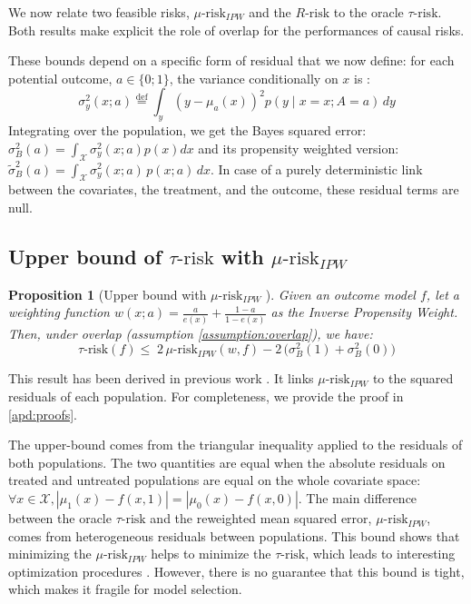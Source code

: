 \documentclass[french,12pt,twoside,a4paper]{book}
\newtheorem{proposition}{Proposition}
\begin{document}
We now relate two feasible risks, $\mu \text{-risk}_{IPW}$ and the
$R\text{-risk}$ to the oracle $\tau\text{-risk}$. Both results make
explicit the role of overlap for the performances of causal risks.

These bounds depend on a specific form of residual that we now define: for each potential outcome, $a \in  \{0; 1\}$, the variance conditionally on $x$
is \citep{shalit_estimating_2017}:
\begin{equation*}\label{eq:residuals}
  \sigma_{y}^{2}(x ; a) \overset{\text{def}}{=}
  \int_{y}\left(y-\mu_{a}(x)\right)^{2} p(y \mid x=x ; A=a) \, d y
\end{equation*}
Integrating over the population, we get the Bayes squared error:
$\sigma^2_{B}(a) = \int_{\mathcal X} \sigma_y^2(x;a) p(x)dx$
and its propensity weighted version:
$\tilde{\sigma}^2_{B}(a) = \int_{\mathcal X}\sigma_y^2(x;a)\,  p(x;
  a)\,dx$. In case of a purely deterministic link between the
covariates, the treatment, and the outcome, these residual terms are null.


\subsection{Upper bound of $\tau\text{-risk}$ with $\mu\text{-risk}_{IPW}$}%
\label{theory:mu_risk_ipw_bound}%

\begin{proposition}[Upper bound with $\mu \text{-risk}_{IPW}$
  ]\label{theory:prop:mu_risk_ipw_bound}
  \citep{johansson2022generalization} Given an outcome model $f$, let a
  weighting function $w(x; a) = \frac{a}{e(x)} + \frac{1-a}{1-e(x)}$ as the
  Inverse Propensity Weight. Then, under overlap (assumption
  \ref{assumption:overlap}), we have:
  \begin{equation*}
    \tau\text{-risk}(f) \leq \; 2 \, \mu\text{-risk}_{IPW}(w, f)
    - 2 \, \big(\sigma^2_{B}(1) +  \sigma^2_{B}(0)\big)
  \end{equation*}
\end{proposition}
This result has been derived in previous work
\citep{johansson2022generalization}. It links $\mu\text{-risk}_{IPW}$ to
the squared residuals of each population. For completeness, we provide the proof in \ref{apd:proofs}.

The upper-bound comes from the triangular inequality applied to the residuals of
both populations. The two quantities are equal when the
absolute residuals on treated and untreated populations are equal on the
whole covariate space:
$\forall x \in \mathcal X, |\mu_1(x) - f(x, 1)| = |\mu_0(x) - f(x, 0)|$.
The main difference between the oracle $\tau \text{-risk}$ and the
reweighted mean squared error, $\mu\text{-risk}_{IPW}$, comes from heterogeneous
residuals between populations.
%
This bound shows that minimizing the $\mu\text{-risk}_{IPW}$ helps to
minimize the $\tau\text{-risk}$, which leads to
interesting optimization procedures \citep{johansson2022generalization}. However, there is no
guarantee that this bound is tight, which makes it fragile for model
selection.
\end{document}
